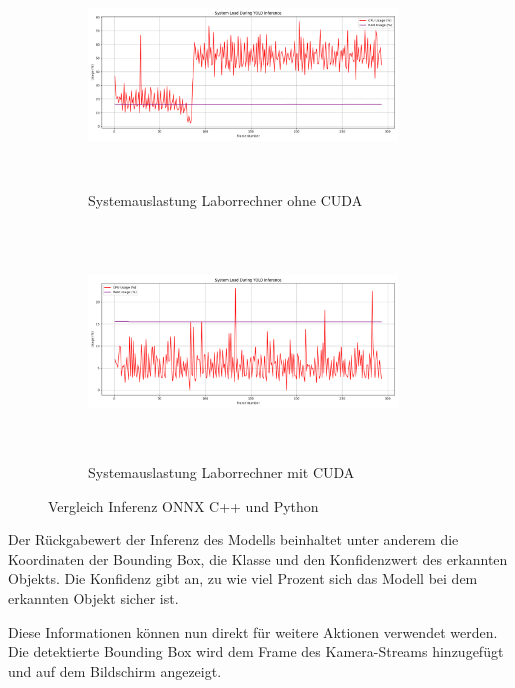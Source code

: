 \begin{figure}[h!]
  \centering
  \begin{subfigure}[b]{\textwidth}
    \centering
    \includegraphics[width=0.9\textwidth,height=5.9cm,keepaspectratio]{images/system_load_plot_CPU_Laborrechner.png}
    \caption{Systemauslastung Laborrechner ohne CUDA}
    \label{fig:CPU und RAM-Auslastung ohne CUDA}
  \end{subfigure}
  \hfill
  \begin{subfigure}[b]{\textwidth}
    \centering
    \includegraphics[width=0.9\textwidth,height=6.2cm,keepaspectratio]{images/system_load_plot_CUDA.png}
    \caption{Systemauslastung Laborrechner mit CUDA}
    \label{fig:CPU und RAM-Auslastung mit CUDA}
  \end{subfigure}
  \caption{Vergleich Inferenz ONNX C++ und Python}
  \label{tab:CPU und RAM-Auslastung CPU vs CUDA}
\end{figure}

\newpage

Der Rückgabewert der Inferenz des Modells beinhaltet unter anderem die Koordinaten der Bounding Box, die Klasse und den Konfidenzwert des erkannten Objekts. Die Konfidenz gibt an, zu wie viel Prozent sich das Modell bei dem erkannten Objekt sicher ist. \cite{InferenzResults} 

Diese Informationen können nun direkt für weitere Aktionen verwendet werden. Die detektierte Bounding Box wird dem Frame des Kamera-Streams hinzugefügt und auf dem Bildschirm angezeigt. 